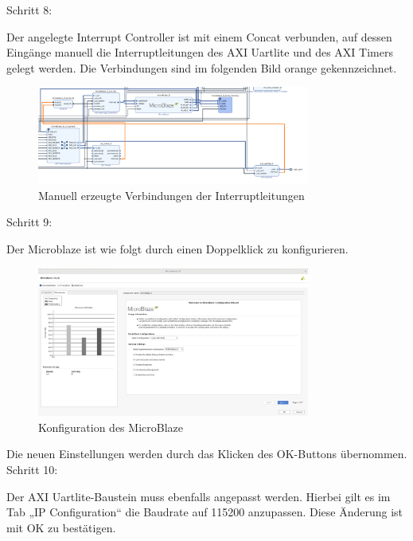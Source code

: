Schritt 8:

Der angelegte Interrupt Controller ist mit einem Concat verbunden, auf dessen Eingänge manuell die Interruptleitungen des AXI Uartlite und des AXI Timers gelegt werden.
Die Verbindungen sind im folgenden Bild orange gekennzeichnet.

\begin{figure}[H]
\centering
\includegraphics[width=0.8\textwidth]{Hauptteil/Schritt8.png}
\caption{Manuell erzeugte Verbindungen der Interruptleitungen}\label{fig:mbschritt8}
\end{figure}

Schritt 9:

Der Microblaze ist wie folgt durch einen Doppelklick zu konfigurieren.

\begin{figure}[H]
\centering
\includegraphics[width=0.8\textwidth]{Hauptteil/Schritt9.png}
\caption{Konfiguration des MicroBlaze}\label{fig:mbschritt9}
\end{figure}

Die neuen Einstellungen werden durch das Klicken des OK-Buttons übernommen.\\

Schritt 10:

Der AXI Uartlite-Baustein muss ebenfalls angepasst werden. Hierbei gilt es im Tab „IP Configuration“ die Baudrate auf 115200 anzupassen.
Diese Änderung ist mit OK zu bestätigen.

